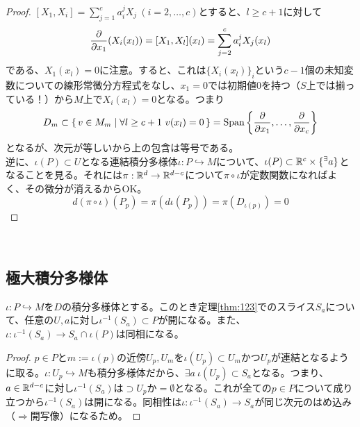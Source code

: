 \begin{proof}
    $[X_1,X_i]=\sum_{j=1}^c a_i^j X_j\ (i=2,\dots,c)$とすると、$l\geq c+1$に対して
    \[\frac{\partial }{\partial x_1}(X_i(x_l))=[X_1,X_l](x_l)=\sum_{j=2}^c a_i^j X_j(x_l)\]
    である、$X_1(x_l)=0$に注意。すると、これは$\{X_i(x_l)\}_i$という$c-1$個の未知変数についての線形常微分方程式をなし、$x_1=0$では初期値$0$を持つ（$S$上では揃っている！）から$M$上で$X_i(x_l)=0$となる。つまり\\
    \[D_m\subset\set{v\in M_m}{\forall l\geq c+1\ v(x_l)=0}=\spn\left\{\pdiff{}{x_1},\dots,\pdiff{}{x_c}\right\}\]
    となるが、次元が等しいから上の包含は等号である。\\
    逆に、$\iota(P)\subset U$となる連結積分多様体$\iota:P\hookrightarrow M$について、$\iota(P)\subset\mathbb{R}^c\times\{{}^\exists a\}$となることを見る。それには$\pi:\mathbb{R}^d\to\mathbb{R}^{d-c}$について$\pi\circ\iota$が定数関数になればよく、その微分が消えるからOK。
    \[d(\pi\circ\iota)(P_p)=\pi(d\iota(P_p))=\pi(D_{\iota(p)})=0\]
\end{proof}


\ \\
\subsection{極大積分多様体}
\begin{lem}[積分多様体の位相]
    $\iota:P\hookrightarrow M$を$D$の積分多様体とする。このとき定理\ref{thm:123}でのスライス$S_a$について、任意の$U,a$に対し$\iota^{-1}(S_a)\subset P$が開になる。また、$\iota:\iota^{-1}(S_a)\to S_a\cap\iota(P)$は同相になる。
\end{lem}
\begin{proof}
    $p\in P$と$m:=\iota(p)$の近傍$U_p,U_m$を$\iota(U_p)\subset U_m$かつ$U_p$が連結となるように取る。$\iota:U_p\hookrightarrow M$も積分多様体だから、$\exists a\ \iota(U_p)\subset S_a$となる。つまり、$a\in\mathbb{R}^{d-c}$に対し$\iota^{-1}(S_a)$は$\supset U_p$か$=\emptyset$となる。これが全ての$p\in P$について成り立つから$\iota^{-1}(S_a)$は開になる。同相性は$\iota:\iota^{-1}(S_a)\to S_a$が同じ次元のはめ込み（$\Rightarrow$開写像）になるため。
\end{proof}

